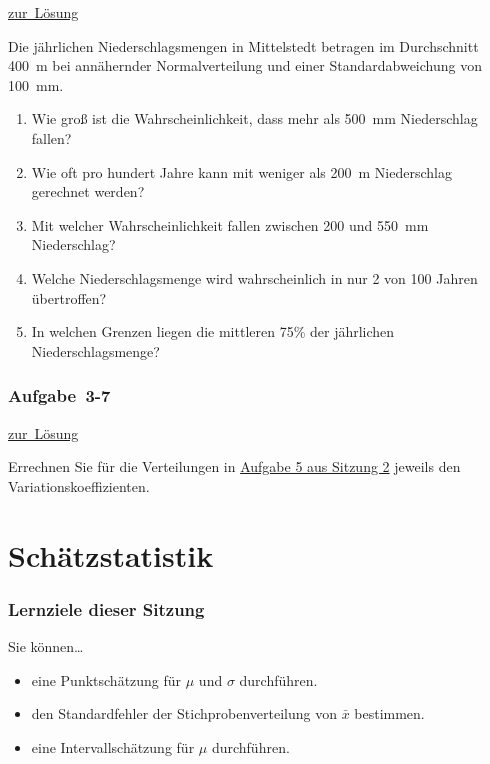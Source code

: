 \documentclass[
  11pt,
  ngerman,
  a4paper,
]{report}
\providecommand{\tightlist}{%
  \setlength{\itemsep}{0pt}\setlength{\parskip}{0pt}}
\begin{document}
\protect\hyperlink{loesung-3-6}{zur~Lösung}

Die jährlichen Niederschlagsmengen in Mittelstedt betragen im Durchschnitt 400~m bei annähernder Normalverteilung und einer Standardabweichung von 100~mm.

\begin{enumerate}
\def\labelenumi{\alph{enumi})}
\tightlist
\item
  Wie groß ist die Wahrscheinlichkeit, dass mehr als 500~mm Niederschlag fallen?
\item
  Wie oft pro hundert Jahre kann mit weniger als 200~m Niederschlag gerechnet werden?
\item
  Mit welcher Wahrscheinlichkeit fallen zwischen 200 und 550~mm Niederschlag?
\item
  Welche Niederschlagsmenge wird wahrscheinlich in nur 2 von 100 Jahren übertroffen?
\item
  In welchen Grenzen liegen die mittleren 75\% der jährlichen Niederschlagsmenge?
\end{enumerate}

\hypertarget{aufgabe-3-7}{%
\subsection{Aufgabe~3-7}\label{aufgabe-3-7}}

\protect\hyperlink{loesung-3-7}{zur~Lösung}

Errechnen Sie für die Verteilungen in \protect\hyperlink{aufgabe-2-5}{Aufgabe 5 aus Sitzung 2} jeweils den Variationskoeffizienten.

\hypertarget{schuxe4tzstatistik}{%
\chapter{Schätzstatistik}\label{schuxe4tzstatistik}}

\hypertarget{lernziele-dieser-sitzung-3}{%
\subsection*{Lernziele dieser Sitzung}\label{lernziele-dieser-sitzung-3}}

Sie können\ldots{}

\begin{itemize}
\tightlist
\item
  eine Punktschätzung für \(\mu\) und \(\sigma\) durchführen.
\item
  den Standardfehler der Stichprobenverteilung von \(\bar{x}\) bestimmen.
\item
  eine Intervallschätzung für \(\mu\) durchführen.
\end{itemize}
\end{document}
